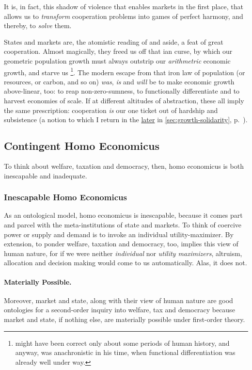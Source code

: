 It is, in fact, this shadow of violence that enables markets in the first place, that allows us to \emph{transform} cooperation problems into games of perfect harmony, and thereby, to \emph{solve} them. 

States and markets are, the atomistic reading of \citeauthor{Hobbes-1651-aa} and \citeauthor{Smith-1776-lq} aside, a feat of great cooperation. 
Almost magically, they freed us off that \citeauthor{Malthus1798}ian curse, by which our geometric population growth must always outstrip our \emph{arithmetric} economic growth, and starve us
\footnote{
	\cite{Malthus1798} might have been correct only about some periods of human history, and anyway, was anachronistic in his time, when functional differentiation was already well under way.
}.
The modern escape from that iron law of population (or resources, or carbon, and so on) \emph{was}, \emph{is} and \emph{will} be to make economic growth above-linear, too: to reap non-zero-sumness, to functionally differentiate and to harvest economies of scale. 
If at different altitudes of abstraction, these all imply the same prescription: cooperation \emph{is} our one ticket out of hardship and subsistence (a notion to which I return in the \hyperref[sec:growth-solidarity]{later} in \autoref{sec:growth-solidarity}, p.~\pageref{sec:growth-solidarity}).

\subsection{Contingent Homo Economicus} \label{sec:contingent-homo-economicus} 
To think about welfare, taxation and democracy, then, homo economicus is both inescapable and inadequate. 

\subsubsection{Inescapable Homo Economicus} 
As an ontological model, homo economicus is inescapable, because it comes part and parcel with the meta-institutions of state and markets. 
To think of coercive power or supply and demand is to invoke an individual utility-maximizer. 
By extension, to ponder welfare, taxation and democracy, too, implies this view of human nature, for if we were neither \emph{individual} nor \emph{utility maximizers}, altruism, allocation and decision making would come to us automatically. 
Alas, it does not.

\paragraph{Materially Possible.} 
Moreover, market and state, along with their view of human nature are good ontologies for a second-order inquiry into welfare, tax and democracy because market and state, if nothing else, are materially possible under first-order theory. %

